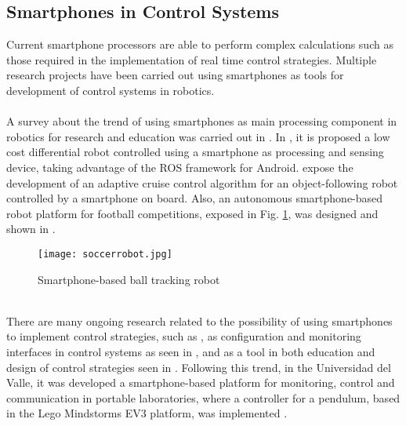 \subsection{Smartphones in Control Systems}
Current smartphone processors are able to perform complex calculations such as those required in the implementation of real time control strategies. Multiple research projects have been carried out using smartphones as tools for development of control systems in robotics.
\\\\
A survey about the trend of using smartphones as main processing component in robotics for research and education was carried out in \cite{Oros2013a}.
In \cite{DeABarbosa2015}, it is proposed a low cost differential robot controlled using a smartphone as processing and sensing device, taking advantage of the ROS framework for Android. \cite{Gunawan2014} expose the development of an adaptive cruise control algorithm for an object-following robot controlled by a smartphone on board. Also, an autonomous smartphone-based robot platform for football competitions, exposed in Fig. \ref{fig:soccer}, was designed and shown in \cite{Tetzlaff2013}.
\begin{figure}[h]
\begin{center}
\texttt{[image: soccerrobot.jpg]}    
\caption[Smartphone-based ball tracking robot]{Smartphone-based ball tracking robot \protect\footnotemark} 
\label{fig:soccer}
\end{center}
\end{figure}
\\There are many ongoing research related to the possibility of using smartphones to implement control strategies, such as \cite{Drumea2013a}, as configuration and monitoring interfaces in control systems as seen in \cite{Lin2014a,Truong2012a, Lu2017}, and as a tool in both education and design of control strategies seen in \cite{Aristizabal2014a,WuWu2013a}. Following this trend, in the Universidad del Valle, it was developed a smartphone-based platform for monitoring, control and communication in portable laboratories, where a controller for a pendulum, based in the Lego Mindstorms EV3 platform, was implemented \cite {GarciaTellez2015}.

